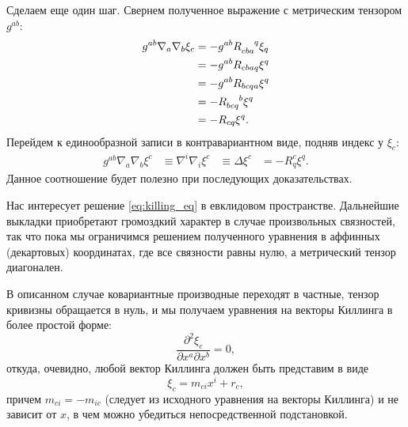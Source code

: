 \documentclass[12pt,a4paper]{article}
\begin{document}
            Сделаем еще один шаг. Свернем полученное выражение с метрическим тензором $g^{ab}$:
            \begin{equation}\begin{aligned}
                g^{ab} \nabla_a \nabla_b \xi_c
                    &= - g^{ab} R_{cba}^{\hphantom{cba}q} \xi_q \\
                    &= - g^{ab} R_{cbaq} \xi^q \\
                    &= - g^{ab} R_{bcqa} \xi^q \\
                    &= - R_{bcq}^{\hphantom{bcq}b} \xi^q \\
                    &= - R_{cq} \xi^q .
            \end{aligned}\end{equation}
            Перейдем к единообразной записи в контравариантном виде, подняв индекс у $\xi_c$:
            \begin{equation}\begin{aligned}\label{eq:killing_eq_lap}
                g^{ab} \nabla_a \nabla_b \xi^c
                    &\equiv \nabla^i \nabla_i \xi^c
                    &\equiv \Delta \xi^c
                    &= - R^c_q \xi^q .
            \end{aligned}\end{equation}
            Данное соотношение будет полезно при последующих доказательствах.

            Нас интересует решение \autoref{eq:killing_eq} в евклидовом пространстве. Дальнейшие выкладки приобретают громоздкий характер в случае произвольных связностей, так что пока мы ограничимся решением полученного уравнения в аффинных (декартовых) координатах, где все связности равны нулю, а метрический тензор диагонален.

            В описанном случае ковариантные производные переходят в частные, тензор кривизны обращается в нуль, и мы получаем уравнения на векторы Киллинга в более простой форме:
            \begin{equation}
                \frac{\partial^2 \xi_c}{\partial x^a \partial x^b} = 0,
            \end{equation}
            откуда, очевидно, любой вектор Киллинга должен быть представим в виде
            \begin{equation}
                \xi_c = m_{ci} x^i + r_c,
            \end{equation}
            причем $m_{ci} = - m_{ic}$ (следует из исходного уравнения на векторы Киллинга) и не зависит от $x$, в чем можно убедиться непосредственной подстановкой.
\end{document}
